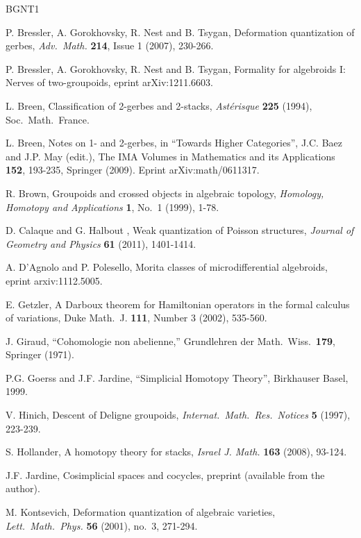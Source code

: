 \documentclass[a4paper,10pt]{amsart}
\theoremstyle{definition}
\numberwithin{equation}{section}
\begin{document}
\begin{thebibliography}{BGNT1}

 P. Bressler, A. Gorokhovsky, R. Nest and
	B. Tsygan, Deformation quantization of gerbes,
	{\em Adv.\ Math.} {\bf 214}, Issue 1 (2007), 230-266.

 P. Bressler, A. Gorokhovsky, R. Nest and
B. Tsygan, 
Formality for algebroids I: Nerves of two-groupoids,
eprint arXiv:1211.6603.

 L. Breen, Classification of 2-gerbes and 2-stacks, 
{\em Ast\'erisque} {\bf 225} (1994), Soc.\ Math.\ France.

 L. Breen, 
Notes on 1- and 2-gerbes, 
in ``Towards Higher Categories'',  J.C. Baez and J.P. May (edit.), The IMA
Volumes in Mathematics and its Applications {\bf 152}, 193-235, Springer (2009).
Eprint arXiv:math/0611317.

 R. Brown,
  Groupoids and crossed objects in algebraic topology,
  {\em Homology, Homotopy and Applications} {\bf 1}, No.\ 1 (1999), 1-78.

 D. Calaque and G. Halbout ,
   Weak quantization of Poisson structures,
  {\em Journal of Geometry and Physics} {\bf 61} (2011), 1401-1414.

 A. D'Agnolo and P. Polesello, 
Morita classes of microdifferential algebroids,
eprint  arxiv:1112.5005.

 E. Getzler,
	A Darboux theorem for Hamiltonian operators in the formal
	calculus of variations,
	Duke Math.\ J. {\bf 111}, Number 3 (2002), 535-560. 

 J. Giraud, 
    ``Cohomologie non abelienne,'' 
    Grundlehren der Math.\ Wiss.\ {\bf 179}, Springer (1971).

 P.G. Goerss and J.F. Jardine, 
  ``Simplicial Homotopy Theory'',
  Birkhauser Basel, 1999.

 V. Hinich, 
    Descent of Deligne groupoids,
    {\em Internat.\ Math.\ Res.\ Notices} {\bf 5} (1997), 223-239.

 S. Hollander,
A homotopy theory for stacks, {\em Israel J. Math.} {\bf 163} (2008), 93-124. 

J.F. Jardine, Cosimplicial spaces and cocycles, preprint (available from the
author). 

 M. Kontsevich,
    Deformation quantization of algebraic varieties,
    {\em Lett.\ Math.\ Phys.} {\bf 56} (2001), no.\ 3, 271-294.


\end{thebibliography}
\end{document}
